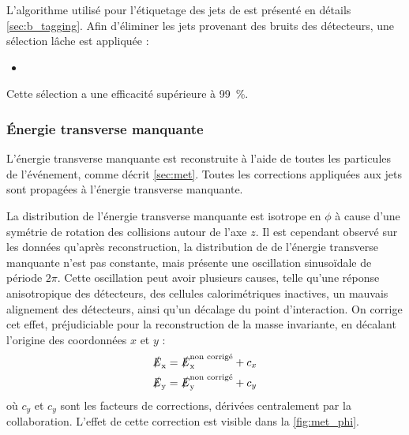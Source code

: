 L'algorithme utilisé pour l'étiquetage des jets de \Pbottom est présenté en détails \cref{sec:b_tagging}. Afin d'éliminer les jets provenant des bruits des détecteurs, une sélection lâche est appliquée :
\begin{itemize}
  \item {}
\end{itemize}

Cette sélection a une efficacité supérieure à \SI{99}{\%}.

\subsubsection{Énergie transverse manquante}

L'énergie transverse manquante est reconstruite à l'aide de toutes les particules \pf de l'événement, comme décrit \cref{sec:met}. Toutes les corrections appliquées aux jets sont propagées à l'énergie transverse manquante.

\medskip

La distribution de l'énergie transverse manquante est isotrope en $\phi$ à cause d'une symétrie de rotation des collisions autour de l'axe $z$. Il est cependant observé sur les données qu'après reconstruction, la distribution de \phi de l'énergie transverse manquante n'est pas constante, mais présente une oscillation sinusoïdale de période \tilde$\num{2}\pi$. Cette oscillation peut avoir plusieurs causes, telle qu'une réponse anisotropique des détecteurs, des cellules calorimétriques inactives, un mauvais alignement des détecteurs, ainsi qu'un décalage du point d'interaction. On corrige cet effet, préjudiciable pour la reconstruction de la masse invariante, en décalant l'origine des coordonnées $x$ et $y$ :
\begin{align*}
  \slashed{E}_{\mathrm{x}} &= \slashed{E}_{\mathrm{x}}^\text{non corrigé} + c_x\\
  \slashed{E}_{\mathrm{y}} &= \slashed{E}_{\mathrm{y}}^\text{non corrigé} + c_y
\end{align*}
où $c_y$ et $c_y$ sont les facteurs de corrections, dérivées centralement par la collaboration. L'effet de cette correction est visible dans la \cref{fig:met_phi}.

\bigskip

